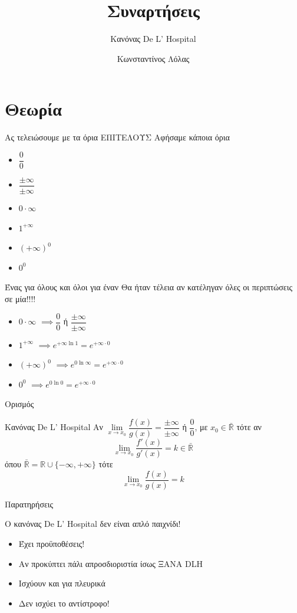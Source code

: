 \documentclass{presentation}
\title{Συναρτήσεις}
\subtitle{Κανόνας De L' Hospital}
\author[Λόλας]{Κωνσταντίνος Λόλας}
\begin{document}
\begin{frame}
  \titlepage
\end{frame}

\section{Θεωρία}
\begin{frame}{Ας τελειώσουμε με τα όρια ΕΠΙΤΕΛΟΥΣ}
  Αφήσαμε κάποια όρια
  \begin{itemize}
    \item $\dfrac{0}{0}$
    \item $\dfrac{\pm\infty}{\pm\infty}$
    \item $0\cdot \infty$
    \item $1^{+\infty}$
    \item $(+\infty)^0$
    \item $0^0$
  \end{itemize}
\end{frame}

\begin{frame}{Ένας για όλους και όλοι για έναν}
  Θα ήταν τέλεια αν κατέληγαν όλες οι περιπτώσεις σε μία!!!!
  \begin{itemize}
    \item<1-> $0\cdot \infty$ $\implies \dfrac{0}{0}$ ή $\dfrac{\pm\infty}{\pm\infty}$
    \item<3-> $1^{+\infty}$  $\implies e^{+\infty\ln 1}=e^{+\infty\cdot 0}$
    \item<5-> $(+\infty)^0$  $\implies e^{0\ln\infty}=e^{+\infty\cdot 0}$
    \item<7-> $0^0$  $\implies e^{0\ln 0}=e^{+\infty\cdot 0}$
  \end{itemize}
\end{frame}

\begin{frame}{Ορισμός}
  \begin{block}{Κανόνας De L' Hospital}
    Αν $\lim\limits_{x \to x_0}{ \dfrac{f(x)}{g(x)} }=\dfrac{\pm\infty}{\pm\infty}$ ή $\dfrac{0}{0}$, με $x_0\in\bar{\mathbb{R}}$ τότε αν
    $$\lim\limits_{x \to x_0}{ \dfrac{f'(x)}{g'(x)} }=k\in\bar{\mathbb{R}}$$
    όπου $\bar{\mathbb{R}}=\mathbb{R}\cup \{-\infty,+\infty\}$ τότε
    $$\lim\limits_{x \to x_0}{ \dfrac{f(x)}{g(x)} }=k$$
  \end{block}
\end{frame}

\begin{frame}{Παρατηρήσεις}

  Ο κανόνας De L' Hospital δεν είναι απλό παιχνίδι!

  \begin{itemize}[<+->]
    \item Έχει προϋποθέσεις!
    \item Αν προκύπτει πάλι απροσδιοριστία ίσως ΞΑΝΑ DLH
    \item Ισχύουν και για πλευρικά
    \item Δεν ισχύει το αντίστροφο!
  \end{itemize}

\end{frame}
\end{document}
